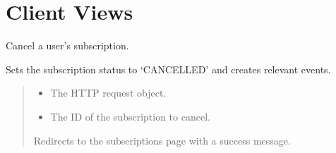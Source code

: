\documentclass[letterpaper,10pt,english]{sphinxmanual}
\begin{document}
\section{Client Views}
\label{\detokenize{modules/views:module-client.views}}\label{\detokenize{modules/views:client-views}}

\begin{fulllineitems}
\label{\detokenize{modules/views:client.views.cancel_subscription}}
\pysigstartsignatures
{}
\pysigstopsignatures
\sphinxAtStartPar
Cancel a user’s subscription.

\sphinxAtStartPar
Sets the subscription status to ‘CANCELLED’ and creates relevant events.
\begin{quote}\begin{description}
\begin{itemize}
\item {} 
\sphinxAtStartPar
{} \textendash{} The HTTP request object.

\item {} 
\sphinxAtStartPar
{} \textendash{} The ID of the subscription to cancel.

\end{itemize}

\sphinxAtStartPar
Redirects to the subscriptions page with a success message.

\end{description}\end{quote}

\end{fulllineitems}

\end{document}
